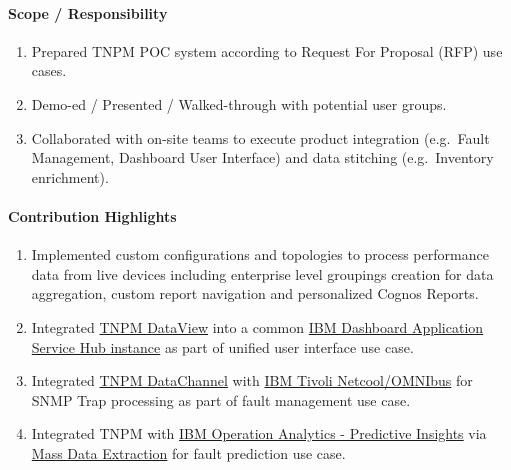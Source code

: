 \documentclass[
]{article}
\providecommand{\tightlist}{%
  \setlength{\itemsep}{0pt}\setlength{\parskip}{0pt}}
\begin{document}
\hypertarget{scope-responsibility-9}{%
\paragraph{Scope / Responsibility}\label{scope-responsibility-9}}

\begin{enumerate}
\def\labelenumi{\arabic{enumi}.}
\tightlist
\item
  Prepared TNPM POC system according to Request For Proposal (RFP) use
  cases.
\item
  Demo-ed / Presented / Walked-through with potential user groups.
\item
  Collaborated with on-site teams to execute product integration
  (e.g.~Fault Management, Dashboard User Interface) and data stitching
  (e.g.~Inventory enrichment).
\end{enumerate}

\hypertarget{contribution-highlights-9}{%
\paragraph{Contribution Highlights}\label{contribution-highlights-9}}

\begin{enumerate}
\def\labelenumi{\arabic{enumi}.}
\tightlist
\item
  Implemented custom configurations and topologies to process
  performance data from live devices including enterprise level
  groupings creation for data aggregation, custom report navigation and
  personalized Cognos Reports.
\item
  Integrated
  \href{https://www.ibm.com/support/knowledgecenter/SSBNJ7_1.3.2/com.ibm.tnpm.doc/DataView/ctnpm_dv_userguide.html}{TNPM
  DataView} into a common
  \href{https://www.ibm.com/developerworks/community/groups/service/html/communitystart?communityUuid=b8caedd7-3aca-41c1-a9c1-7be87a51c50e}{IBM
  Dashboard Application Service Hub instance} as part of unified user
  interface use case.
\item
  Integrated
  \href{http://www.ibm.com/support/knowledgecenter/SSBNJ7_1.4.1/install/ctnpm_installguide_tivolinetcoolperformancemanagerarchitecture-03-02.html}{TNPM
  DataChannel} with
  \href{http://www-03.ibm.com/software/products/en/ibmtivolinetcoolomnibus}{IBM
  Tivoli Netcool/OMNIbus} for SNMP Trap processing as part of fault
  management use case.
\item
  Integrated TNPM with
  \href{http://www-03.ibm.com/software/products/en/ibm-operations-analytics---predictive-insights}{IBM
  Operation Analytics - Predictive Insights} via
  \href{https://www.ibm.com/support/knowledgecenter/SSBNJ7_1.3.2/com.ibm.tnpm.doc/pdf/pdf_tnpm_mass_data_extraction.pdf}{Mass
  Data Extraction} for fault prediction use case.
\end{enumerate}
\end{document}
